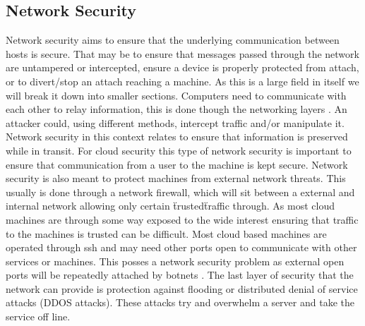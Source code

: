 \documentclass[12pt]{article}
\begin{document}

\subsection{Network Security}
Network security aims to ensure that the underlying communication between hosts is secure. That may be to ensure that messages passed through the network are untampered or intercepted, ensure a device is properly protected from attach, or to divert/stop an attach reaching a machine. As this is a large field in itself we will break it down into smaller sections. Computers need to communicate with each other to relay information, this is done though the networking layers \cite{wiki:osiModel}. An attacker could, using different methods, intercept traffic and/or manipulate it. Network security in this context relates to ensure that information is preserved while in transit. For cloud security this type of network security is important to ensure that communication from a user to the machine is kept secure. Network security is also meant to protect machines from external network threats. This usually is done through a network firewall, which will sit between a external and internal network allowing only certain \"trusted\" traffic through. As most cloud machines are through some way exposed to the wide interest ensuring that traffic to the machines is trusted can be difficult. Most cloud based machines are operated through ssh and may need other ports open to communicate with other services or machines. This posses a network security problem as external open ports will be repeatedly attached by botnets \cite{wiki:botnets}. The last layer of security that the network can provide is protection against flooding or distributed denial of service attacks (DDOS attacks). These attacks try and overwhelm a server and take the service off line.
\end{document}
